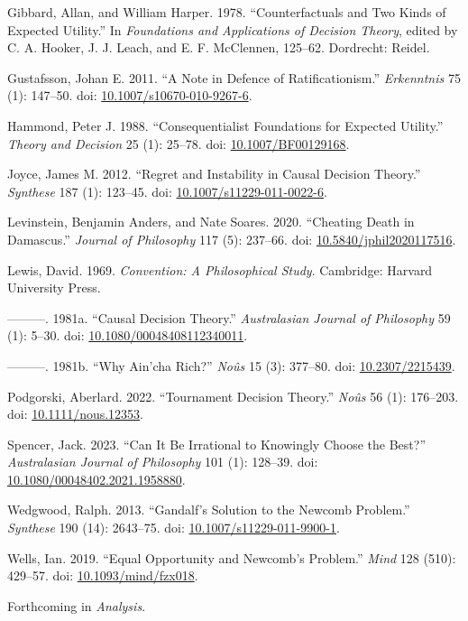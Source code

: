 \documentclass[
  10pt,
  letterpaper,
  DIV=11,
  numbers=noendperiod,
  twoside]{scrartcl}
\newlength{\cslhangindent}
\newenvironment{CSLReferences}[2] %
 {\begin{list}{}{%
  \setlength{\itemindent}{0pt}
  \setlength{\leftmargin}{0pt}
  \setlength{\parsep}{0pt}
  \ifodd #1
   \setlength{\leftmargin}{\cslhangindent}
   \setlength{\itemindent}{-1\cslhangindent}
  \fi
  \setlength{\itemsep}{#2\baselineskip}}}
 {\end{list}}
\begin{document}
\begin{CSLReferences}{1}{0}
Gibbard, Allan, and William Harper. 1978. {``Counterfactuals and Two
Kinds of Expected Utility.''} In \emph{Foundations and Applications of
Decision Theory}, edited by C. A. Hooker, J. J. Leach, and E. F.
McClennen, 125--62. Dordrecht: Reidel.

Gustafsson, Johan E. 2011. {``A Note in Defence of Ratificationism.''}
\emph{Erkenntnis} 75 (1): 147--50. doi:
\href{https://doi.org/10.1007/s10670-010-9267-6}{10.1007/s10670-010-9267-6}.

Hammond, Peter J. 1988. {``Consequentialist Foundations for Expected
Utility.''} \emph{Theory and Decision} 25 (1): 25--78. doi:
\href{https://doi.org/10.1007/BF00129168}{10.1007/BF00129168}.

Joyce, James M. 2012. {``Regret and Instability in Causal Decision
Theory.''} \emph{Synthese} 187 (1): 123--45. doi:
\href{https://doi.org/10.1007/s11229-011-0022-6}{10.1007/s11229-011-0022-6}.

Levinstein, Benjamin Anders, and Nate Soares. 2020. {``Cheating Death in
Damascus.''} \emph{Journal of Philosophy} 117 (5): 237--66. doi:
\href{https://doi.org/10.5840/jphil2020117516}{10.5840/jphil2020117516}.

Lewis, David. 1969. \emph{Convention: A Philosophical Study}. Cambridge:
Harvard University Press.

---------. 1981a. {``Causal Decision Theory.''} \emph{Australasian
Journal of Philosophy} 59 (1): 5--30. doi:
\href{https://doi.org/10.1080/00048408112340011}{10.1080/00048408112340011}.

---------. 1981b. {``Why Ain'cha Rich?''} \emph{No{û}s} 15 (3): 377--80.
doi: \href{https://doi.org/10.2307/2215439}{10.2307/2215439}.

Podgorski, Aberlard. 2022. {``Tournament Decision Theory.''}
\emph{No{û}s} 56 (1): 176--203. doi:
\href{https://doi.org/10.1111/nous.12353}{10.1111/nous.12353}.

Spencer, Jack. 2023. {``Can It Be Irrational to Knowingly Choose the
Best?''} \emph{Australasian Journal of Philosophy} 101 (1): 128--39.
doi:
\href{https://doi.org/10.1080/00048402.2021.1958880}{10.1080/00048402.2021.1958880}.

Wedgwood, Ralph. 2013. {``Gandalf's Solution to the Newcomb Problem.''}
\emph{Synthese} 190 (14): 2643--75. doi:
\href{https://doi.org/10.1007/s11229-011-9900-1}{10.1007/s11229-011-9900-1}.

Wells, Ian. 2019. {``Equal Opportunity and Newcomb's Problem.''}
\emph{Mind} 128 (510): 429--57. doi:
\href{https://doi.org/10.1093/mind/fzx018}{10.1093/mind/fzx018}.

\end{CSLReferences}



\noindent Forthcoming in \emph{Analysis}.
\end{document}
